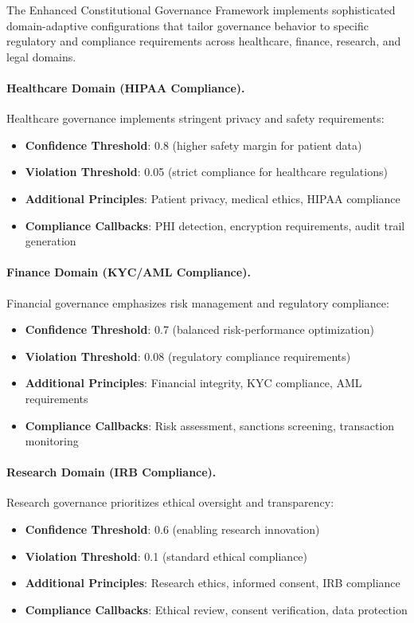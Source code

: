 \documentclass[manuscript,screen,9pt]{acmart}
\begin{document}
The Enhanced Constitutional Governance Framework implements sophisticated domain-adaptive configurations that tailor governance behavior to specific regulatory and compliance requirements across healthcare, finance, research, and legal domains.

\paragraph{Healthcare Domain (HIPAA Compliance).}
Healthcare governance implements stringent privacy and safety requirements:
\begin{itemize}[itemsep=1pt,parsep=1pt]
    \item \textbf{Confidence Threshold}: 0.8 (higher safety margin for patient data)
    \item \textbf{Violation Threshold}: 0.05 (strict compliance for healthcare regulations)
    \item \textbf{Additional Principles}: Patient privacy, medical ethics, HIPAA compliance
    \item \textbf{Compliance Callbacks}: PHI detection, encryption requirements, audit trail generation
\end{itemize}

\paragraph{Finance Domain (KYC/AML Compliance).}
Financial governance emphasizes risk management and regulatory compliance:
\begin{itemize}[itemsep=1pt,parsep=1pt]
    \item \textbf{Confidence Threshold}: 0.7 (balanced risk-performance optimization)
    \item \textbf{Violation Threshold}: 0.08 (regulatory compliance requirements)
    \item \textbf{Additional Principles}: Financial integrity, KYC compliance, AML requirements
    \item \textbf{Compliance Callbacks}: Risk assessment, sanctions screening, transaction monitoring
\end{itemize}

\paragraph{Research Domain (IRB Compliance).}
Research governance prioritizes ethical oversight and transparency:
\begin{itemize}[itemsep=1pt,parsep=1pt]
    \item \textbf{Confidence Threshold}: 0.6 (enabling research innovation)
    \item \textbf{Violation Threshold}: 0.1 (standard ethical compliance)
    \item \textbf{Additional Principles}: Research ethics, informed consent, IRB compliance
    \item \textbf{Compliance Callbacks}: Ethical review, consent verification, data protection
\end{itemize}
\end{document}
